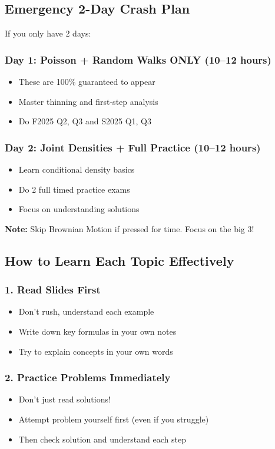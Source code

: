 \documentclass[11pt,letterpaper]{article}
\begin{document}
\subsection{Emergency 2-Day Crash Plan}

If you only have 2 days:

\subsubsection{Day 1: Poisson + Random Walks ONLY (10--12 hours)}
\begin{itemize}[leftmargin=*]
  \item These are 100\% guaranteed to appear
  \item Master thinning and first-step analysis
  \item Do F2025 Q2, Q3 and S2025 Q1, Q3
\end{itemize}

\subsubsection{Day 2: Joint Densities + Full Practice (10--12 hours)}
\begin{itemize}[leftmargin=*]
  \item Learn conditional density basics
  \item Do 2 full timed practice exams
  \item Focus on understanding solutions
\end{itemize}

\textbf{Note:} Skip Brownian Motion if pressed for time. Focus on the big 3!

\subsection{How to Learn Each Topic Effectively}

\subsubsection{1. Read Slides First}
\begin{itemize}[leftmargin=*]
  \item Don't rush, understand each example
  \item Write down key formulas in your own notes
  \item Try to explain concepts in your own words
\end{itemize}

\subsubsection{2. Practice Problems Immediately}
\begin{itemize}[leftmargin=*]
  \item Don't just read solutions!
  \item Attempt problem yourself first (even if you struggle)
  \item Then check solution and understand each step
\end{itemize}
\end{document}
